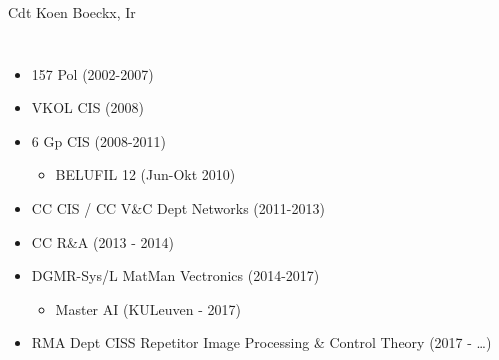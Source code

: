 \documentclass{beamer}
\begin{document}
\begin{frame}{Cdt Koen Boeckx, Ir}
\begin{columns}
\begin{itemize}
    \item 157 Pol (2002-2007)
    \item VKOL CIS (2008)
    \item 6 Gp CIS (2008-2011)
    \begin{itemize}
        \item BELUFIL 12 (Jun-Okt 2010)
    \end{itemize}
    \item CC CIS / CC V\&C Dept Networks (2011-2013)
    \item CC R\&A (2013 - 2014)
    \item DGMR-Sys/L MatMan Vectronics (2014-2017)
    \begin{itemize}
        \item Master AI (KULeuven - 2017)
    \end{itemize}
    \item RMA Dept CISS Repetitor Image Processing \& Control Theory (2017 - \ldots)
\end{itemize}


\end{columns}
\end{frame}
\end{document}
